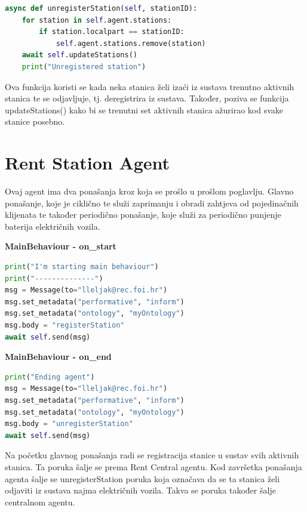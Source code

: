 \documentclass{foi}
\begin{document}
\begin{lstlisting}[language=Python]
async def unregisterStation(self, stationID):
	for station in self.agent.stations:
		if station.localpart == stationID:
			self.agent.stations.remove(station)
	await self.updateStations()
	print("Unregistered station")
\end{lstlisting}

Ova funkcija koristi se kada neka stanica želi izaći iz sustava trenutno aktivnih stanica te se odjavljuje, tj. deregistrira iz sustava. Također, poziva se funkcija updateStations() kako bi se trenutni set aktivnih stanica ažurirao kod svake stanice posebno.

\section{Rent Station Agent}

Ovaj agent ima dva ponašanja kroz koja se prošlo u prošlom poglavlju. Glavno ponašanje, koje je ciklično te služi zaprimanju i obradi zahtjeva od pojedinačnih klijenata te također periodično ponašanje, koje služi za periodično punjenje baterija električnih vozila.

\begin{flushleft}\textbf{MainBehaviour - on\_start}\end{flushleft}

\begin{lstlisting}[language=Python]
print("I'm starting main behaviour")
print("--------------")
msg = Message(to="lleljak@rec.foi.hr")
msg.set_metadata("performative", "inform")
msg.set_metadata("ontology", "myOntology")
msg.body = "registerStation"
await self.send(msg)
\end{lstlisting}

\begin{flushleft}\textbf{MainBehaviour - on\_end}\end{flushleft}

\begin{lstlisting}[language=Python]
print("Ending agent")
msg = Message(to="lleljak@rec.foi.hr")
msg.set_metadata("performative", "inform")
msg.set_metadata("ontology", "myOntology")
msg.body = "unregisterStation"
await self.send(msg)
\end{lstlisting}

Na početku glavnog ponašanja radi se registracija stanice u sustav svih aktivnih stanica. Ta poruka šalje se prema Rent Central agentu. Kod završetka ponašanja agenta šalje se unregisterStation poruka koja označava da se ta stanica želi odjaviti iz sustava najma električnih vozila. Takva se poruka također šalje centralnom agentu.
\end{document}
